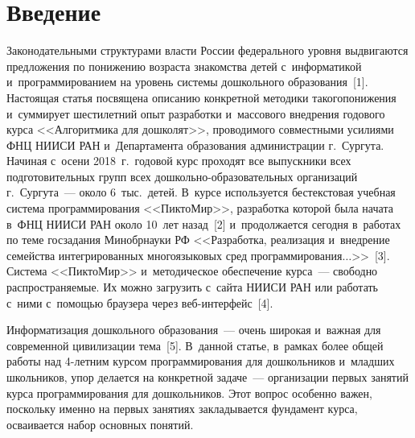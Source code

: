 
 



\thispagestyle{headings}

\begin{multicols}{2}

\label{st\stat}
  
\section{Введение}

  Законодательными структурами власти России федерального уровня 
выдвигаются предложения по понижению возраста знакомства детей 
с~информатикой и~программированием на уровень системы дошкольного 
образования~[1]. Настоящая статья посвящена описанию конкретной методики 
такого\linebreak понижения и~суммирует шестилетний опыт разработки и~массового 
внедрения годового курса <<\mbox{Алгоритмика} для дошколят>>, проводимого 
совместными усилиями ФНЦ НИИСИ РАН и~Департамента образования 
администрации г.~Сур\-гу\-та. Начиная с~осени 2018~г.\ годовой курс проходят 
все выпускники всех подготовительных групп всех до\-школь\-но-об\-ра\-зо\-ва\-тель\-ных 
организаций г.~Сургу\-та~--- 
около 6~тыс.\ детей. В~курсе используется\linebreak
 бестекстовая учебная система 
программирования <<ПиктоМир>>, разработка которой была начата в~ФНЦ 
НИИСИ РАН около 10~лет назад~[2] и~продолжается сегодня в~работах по теме 
госзадания Минобрнауки РФ <<Разработка, реализация и~внедрение семейства 
интегрированных многоязыковых сред программирования$\ldots$>>~[3]. 
Система <<ПиктоМир>> и~методическое обеспечение курса~--- свободно 
распространяемые. Их можно загрузить с~сайта НИИСИ РАН или работать 
с~ними с~по\-мощью браузера через веб-ин\-тер\-фейс~[4].
  
  Информатизация дошкольного образования~--- очень широкая и~важная для 
современной цивилизации тема~[5]. В~данной статье, в~рамках более общей 
работы над 4-лет\-ним курсом программирования для дошкольников и~младших 
школьников, упор делается на конкретной задаче~--- организации первых 
занятий курса программирования для дошкольников. Этот вопрос особенно 
важен, поскольку именно на первых занятиях закладывается фундамент курса, 
осваивается набор основных понятий. 
  

\end{multicols}
